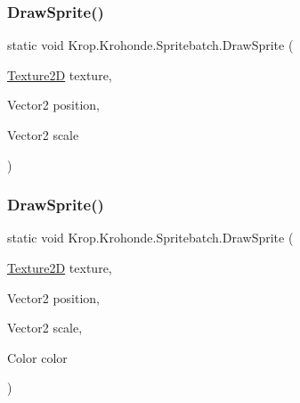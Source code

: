 \subsubsection{\texorpdfstring{Draw\+Sprite()}{DrawSprite()}\hspace{0.1cm}{\footnotesize\ttfamily [4/6]}}
{\footnotesize\ttfamily static void Krop.\+Krohonde.\+Spritebatch.\+Draw\+Sprite (\begin{DoxyParamCaption}\item[{\mbox{\hyperlink{class_krop_1_1_krohonde_1_1_texture2_d}{Texture2D}}}]{texture,  }\item[{Vector2}]{position,  }\item[{Vector2}]{scale }\end{DoxyParamCaption})\hspace{0.3cm}{\ttfamily [static]}}

\mbox{\label{class_krop_1_1_krohonde_1_1_spritebatch_a1c7dd22c521c29636044af5194c846a0}} 
\subsubsection{\texorpdfstring{Draw\+Sprite()}{DrawSprite()}\hspace{0.1cm}{\footnotesize\ttfamily [5/6]}}
{\footnotesize\ttfamily static void Krop.\+Krohonde.\+Spritebatch.\+Draw\+Sprite (\begin{DoxyParamCaption}\item[{\mbox{\hyperlink{class_krop_1_1_krohonde_1_1_texture2_d}{Texture2D}}}]{texture,  }\item[{Vector2}]{position,  }\item[{Vector2}]{scale,  }\item[{Color}]{color }\end{DoxyParamCaption})\hspace{0.3cm}{\ttfamily [static]}}

\mbox{\label{class_krop_1_1_krohonde_1_1_spritebatch_a68b5800b1626fa035e66b7b40badc245}} 
